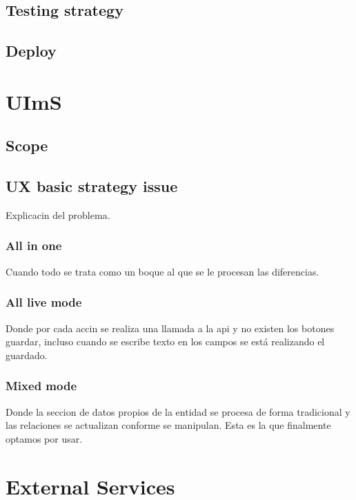 \documentclass[oneside,english,titlepage]{scrbook}
\begin{document}
\subsection{Testing strategy}

\subsection{Deploy}

\section{UImS}

\subsection{Scope}

\subsection{UX basic strategy issue}

Explicacin del problema.

\subsubsection{All in one}

Cuando todo se trata como un boque al que se le procesan las diferencias.

\subsubsection{All live mode}

Donde por cada accin se realiza una llamada a la api y no existen
los botones guardar, incluso cuando se escribe texto en los campos
se está realizando el guardado.

\subsubsection{Mixed mode}

Donde la seccion de datos propios de la entidad se procesa de forma
tradicional y las relaciones se actualizan conforme se manipulan.
Esta es la que finalmente optamos por usar.

\section{External Services}
\end{document}
